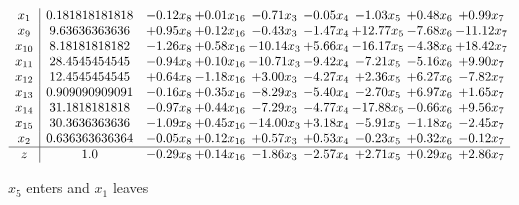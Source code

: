 \documentclass[9pt]{article}
\begin{document}
 \[\begin{array}{c| c c@{\hskip 2pt} c@{\hskip 2pt} c@{\hskip 2pt} c@{\hskip 2pt} c@{\hskip 2pt} c@{\hskip 2pt} c@{\hskip 2pt} }
 x_{1}   &  0.181818181818 & -0.12 x_{8} & +  0.01 x_{16} & -0.71 x_{3} & -0.05 x_{4} & -1.03 x_{5} & +  0.48 x_{6} & +  0.99 x_{7}\\
 x_{9}   &  9.63636363636 & +  0.95 x_{8} & +  0.12 x_{16} & -0.43 x_{3} & -1.47 x_{4} & + 12.77 x_{5} & -7.68 x_{6} & -11.12 x_{7}\\
 x_{10}   &  8.18181818182 & -1.26 x_{8} & +  0.58 x_{16} & -10.14 x_{3} & +  5.66 x_{4} & -16.17 x_{5} & -4.38 x_{6} & + 18.42 x_{7}\\
 x_{11}   &  28.4545454545 & -0.94 x_{8} & +  0.10 x_{16} & -10.71 x_{3} & -9.42 x_{4} & -7.21 x_{5} & -5.16 x_{6} & +  9.90 x_{7}\\
 x_{12}   &  12.4545454545 & +  0.64 x_{8} & -1.18 x_{16} & +  3.00 x_{3} & -4.27 x_{4} & +  2.36 x_{5} & +  6.27 x_{6} & -7.82 x_{7}\\
 x_{13}   &  0.909090909091 & -0.16 x_{8} & +  0.35 x_{16} & -8.29 x_{3} & -5.40 x_{4} & -2.70 x_{5} & +  6.97 x_{6} & +  1.65 x_{7}\\
 x_{14}   &  31.1818181818 & -0.97 x_{8} & +  0.44 x_{16} & -7.29 x_{3} & -4.77 x_{4} & -17.88 x_{5} & -0.66 x_{6} & +  9.56 x_{7}\\
 x_{15}   &  30.3636363636 & -1.09 x_{8} & +  0.45 x_{16} & -14.00 x_{3} & +  3.18 x_{4} & -5.91 x_{5} & -1.18 x_{6} & -2.45 x_{7}\\
 x_{2}   &  0.636363636364 & -0.05 x_{8} & +  0.12 x_{16} & +  0.57 x_{3} & +  0.53 x_{4} & -0.23 x_{5} & +  0.32 x_{6} & -0.12 x_{7}\\
\hline
z    &  1.0 & -0.29 x_{8} & +  0.14 x_{16} & -1.86 x_{3} & -2.57 x_{4} & +  2.71 x_{5} & +  0.29 x_{6} & +  2.86 x_{7}\\
\end{array}\]


 $ x_{5} $ enters and $ x_{1} $ leaves 
\end{document}
